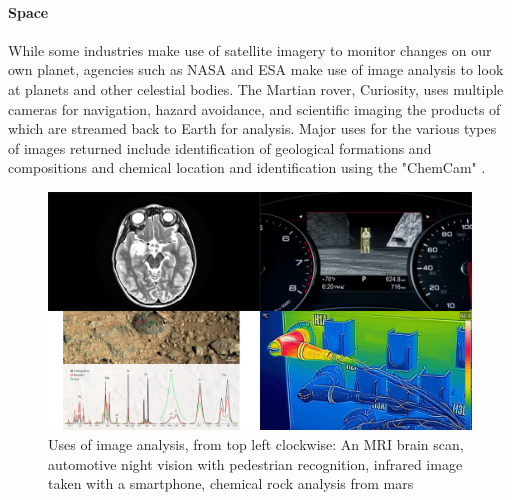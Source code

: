 	\paragraph{Space}
	While some industries make use of satellite imagery to monitor changes on our own planet, agencies such as NASA and ESA make use of image analysis to look at planets and other celestial bodies. The Martian rover, Curiosity, uses multiple cameras for navigation, hazard avoidance, and scientific imaging the products of which are streamed back to Earth for analysis. Major uses for the various types of images returned include identification of geological formations and compositions \citep{curiositysand, curiositygravel} and chemical location and identification using the "ChemCam" \citep{curiosityhydrogen}.
	\begin{figure}[h!]
		\centering
		\includegraphics[width=15cm]{../images/4panel.png}
		\caption{Uses of image analysis, from top left clockwise: An MRI brain scan, automotive night vision with pedestrian recognition, infrared image taken with a smartphone, chemical rock analysis from mars}			
		\label{fig:curiosity}
	\end{figure}